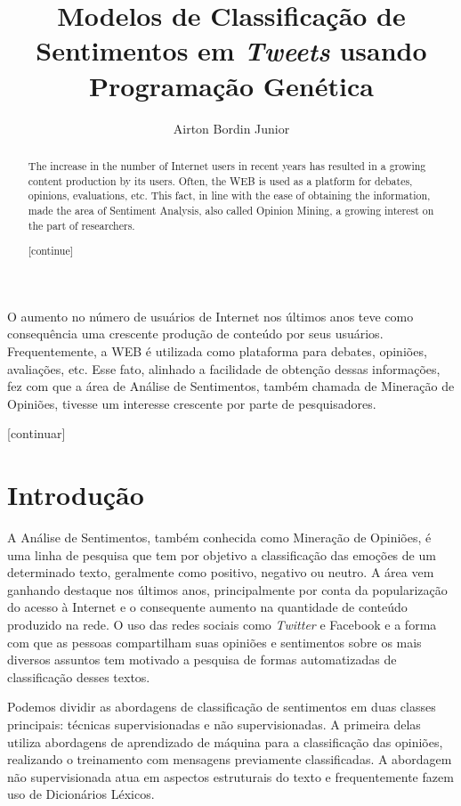 \documentclass[12pt]{article}
\title{Modelos de Classificação de Sentimentos em \emph{Tweets} usando Programação Genética}
\author{Airton Bordin Junior\inst{1}}
\begin{document}
 

\maketitle

\begin{abstract}
The increase in the number of Internet users in recent years has resulted in a growing content production by its users. Often, the WEB is used as a platform for debates, opinions, evaluations, etc. This fact, in line with the ease of obtaining the information, made the area of Sentiment Analysis, also called Opinion Mining, a growing interest on the part of researchers.

[continue]
\end{abstract}

\begin{resumo} 
O aumento no número de usuários de Internet nos últimos anos teve como consequência uma crescente produção de conteúdo por seus usuários. Frequentemente, a WEB é utilizada como plataforma para debates, opiniões, avaliações, etc. Esse fato, alinhado a facilidade de obtenção dessas informações, fez com que a área de Análise de Sentimentos, também chamada de Mineração de Opiniões, tivesse um interesse crescente por parte de pesquisadores. 

[continuar]
\end{resumo}

\section{Introdução}

A Análise de Sentimentos, também conhecida como Mineração de Opiniões, é uma linha de pesquisa que tem por objetivo a classificação das emoções de um determinado texto, geralmente como positivo, negativo ou neutro. A área vem ganhando destaque nos últimos anos, principalmente por conta da popularização do acesso à Internet e o consequente aumento na quantidade de conteúdo produzido na rede. O uso das redes sociais como \emph{Twitter} e Facebook e a forma com que as pessoas compartilham suas opiniões e sentimentos sobre os mais diversos assuntos tem motivado a pesquisa de formas automatizadas de classificação desses textos.

Podemos dividir as abordagens de classificação de sentimentos em duas classes principais: técnicas supervisionadas e não supervisionadas. A primeira delas utiliza abordagens de aprendizado de máquina para a classificação das opiniões, realizando o treinamento com mensagens previamente classificadas. A abordagem não supervisionada atua em aspectos estruturais do texto e frequentemente fazem uso de Dicionários Léxicos.
\end{document}

